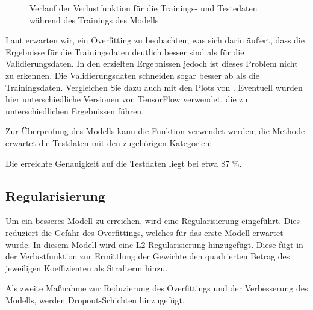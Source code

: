 \medskip

\begin{figure}[H]
	\caption{Verlauf der Verlustfunktion für die Trainings- und Testedaten während des Trainings des Modells}\label{TensorFlowIrisPlotHist2}
\end{figure}

Laut \cite{KDnuggets.07.12.2020} erwarten wir, ein Overfitting zu beobachten, was sich darin äußert, dass die Ergebnisse für die Trainingsdaten deutlich besser sind als für die Validierungsdaten. In den erzielten Ergebnissen jedoch ist dieses Problem nicht zu erkennen. Die Validierungsdaten schneiden sogar besser ab als die Trainingsdaten. Vergleichen Sie dazu auch mit den Plots von \cite{KDnuggets.07.12.2020}. Eventuell wurden hier unterschiedliche Versionen von TensorFlow verwendet, die zu unterschiedlichen Ergebnissen führen.

Zur Überprüfung des Modells kann die Funktion   verwendet werden; die Methode erwartet die Testdaten mit den zugehörigen Kategorien:

\medskip


\medskip

Die erreichte Genauigkeit auf die Testdaten liegt bei etwa 87 \%.

\subsection{Regularisierung}

Um ein besseres Modell zu erreichen, wird eine Regularisierung eingeführt. Dies reduziert die Gefahr des Overfittings, welches für das erste Modell erwartet wurde. In diesem Modell wird eine L2-Regularisierung hinzugefügt. Diese fügt in der Verlustfunktion zur Ermittlung der Gewichte den quadrierten Betrag des jeweiligen Koeffizienten als Strafterm hinzu.  

Als zweite Maßnahme zur Reduzierung des Overfittings und der Verbesserung des Modells, werden Dropout-Schichten hinzugefügt.

